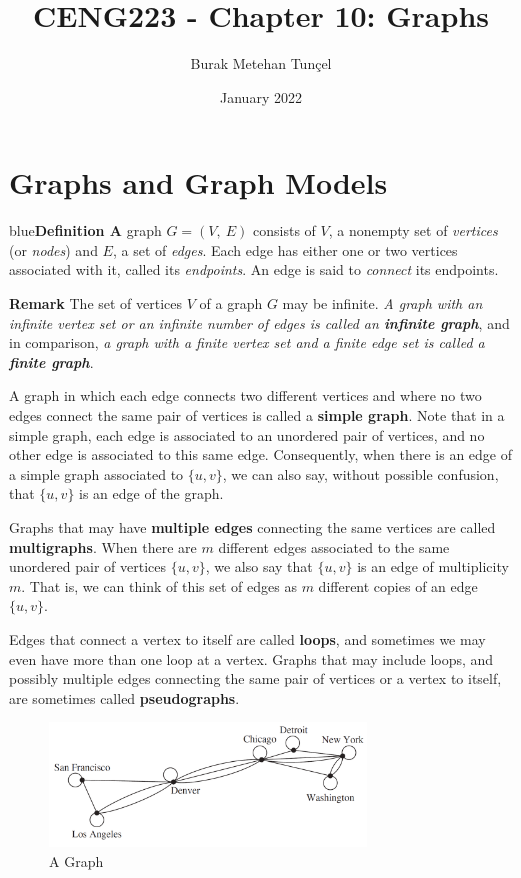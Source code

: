 \documentclass[11pt]{article}
\title{CENG223 - Chapter 10: Graphs}
\author{Burak Metehan Tunçel}
\date{January 2022}
\newenvironment{definition}[1]{\begin{mybox}{blue}{\textbf{Definition #1}}}{\end{mybox}}
\begin{document}
\maketitle

\section{Graphs and Graph Models}

\begin{definition}{1}
A graph $G = (V,\ E)$ consists of $V$, a nonempty set of \textit{vertices} (or \textit{nodes}) and $E$, a set of \textit{edges}. Each edge has either one or two vertices associated with it, called its \textit{endpoints}. An edge is said to \textit{connect} its endpoints.
\end{definition}

\textbf{Remark} The set of vertices $V$ of a graph $G$ may be infinite. \textit{A graph with an infinite vertex set or an infinite number of edges is called an \textbf{infinite graph}}, and in comparison, \textit{a graph with a finite vertex set and a finite edge set is called a \textbf{finite graph}}. 

A graph in which each edge connects two different vertices and where
no two edges connect the same pair of vertices is called a \textbf{simple graph}. Note that in a simple graph, each edge is associated to an unordered pair of vertices, and no other edge is associated to this same edge. Consequently, when there is an edge of a simple graph associated to $\{u, v\}$, we can also say, without possible confusion, that $\{u, v\}$ is an edge of the graph.

Graphs that may have \textbf{multiple edges} connecting the same vertices are called \textbf{multigraphs}. When there are $m$ different edges associated to the same unordered pair of vertices $\{u, v\}$, we also say that $\{u, v\}$ is an edge of multiplicity $m$. That is, we can think of this set of edges as $m$ different copies of an edge $\{u, v\}$.

Edges that connect a vertex to itself are called \textbf{loops}, and sometimes we may even have more than one loop at a vertex. Graphs that may include loops, and possibly multiple edges connecting the same pair of vertices or a vertex to itself, are sometimes called \textbf{pseudographs}.

\begin{figure}[!h]
    \centering
    \includegraphics[width=0.75\textwidth]{img/ch10-figure3.png}
    \caption{A Graph}
    \label{fig:my_label}
\end{figure}
\end{document}
